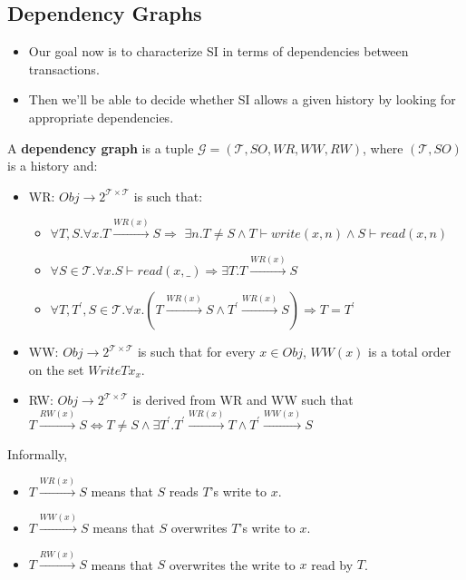 \documentclass{beamer}
\begin{document}
\subsection{Dependency Graphs}

\begin{frame}
	\begin{itemize}
		\item Our goal now is to characterize SI in terms of dependencies between transactions.
		\item Then we'll be able to decide whether SI allows a given history by looking for appropriate dependencies.
	\end{itemize}
\end{frame}


\begin{frame}
\begin{definition}
	A \textbf{dependency graph} is a tuple $\mathcal{G} = (\mathcal{T}, SO, WR, WW, RW)$, where $(\mathcal{T}, SO)$ is a history and:
	\begin{itemize}
		\item WR: $Obj \rightarrow 2^{\mathcal{T} \times \mathcal{T}}$ is such that:
		\begin{itemize}
			\item $\forall T,S. \forall x . T \xrightarrow{WR(x)}S \Rightarrow $ 
			$	\exists n. T \ne S \wedge T \vdash write(x,n) \wedge S \vdash read(x,n)$
			\item $\forall S \in \mathcal{T}. \forall x. S \vdash read(x,\_) \Rightarrow \exists T. T \xrightarrow{WR(x)} S $
			\item $\forall T, T^\prime, S \in \mathcal{T}. \forall x. \left( T \xrightarrow{WR(x)} S \wedge T^\prime \xrightarrow{WR(x)} S \right) \Rightarrow T = T^\prime $
		\end{itemize}
		\item WW: $Obj \rightarrow 2^{\mathcal{T} \times \mathcal{T}}$ is such that for every $x \in Obj$, $WW(x)$ is a total order on the set $WriteTx_x$.
		\item RW: $Obj \rightarrow 2^{\mathcal{T} \times \mathcal{T}}$ is derived from WR and WW such that $T \xrightarrow{RW(x)} S \Leftrightarrow
		T \ne S \wedge \exists T^\prime . T^\prime \xrightarrow{WR(x)}T \wedge T^\prime \xrightarrow{WW(x)}S$
	\end{itemize}
\end{definition}
\end{frame}
\begin{frame}
	Informally,
	\begin{itemize}
		\item $T \xrightarrow{WR(x)} S $ means that $S$ reads $T$'s write to $x$.
		\item $T \xrightarrow{WW(x)} S $ means that $S$ overwrites $T$'s write to $x$.
		\item $T \xrightarrow{RW(x)} S $ means that $S$ overwrites the write to $x$ read by $T$.
	\end{itemize}
\end{frame}
\end{document}

